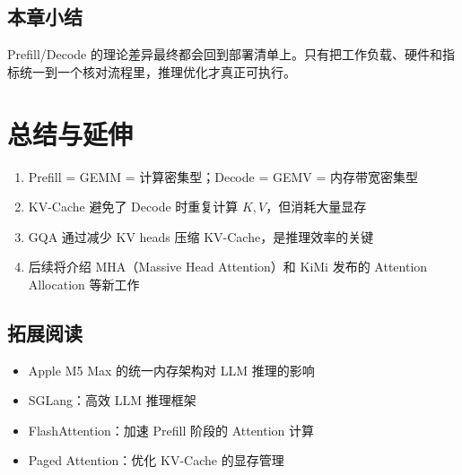 \documentclass[a4paper]{article}
\begin{document}
\subsection{本章小结}
Prefill/Decode 的理论差异最终都会回到部署清单上。只有把工作负载、硬件和指标统一到一个核对流程里，推理优化才真正可执行。

\newpage
\section{总结与延伸}

\begin{enumerate}
  \item Prefill = GEMM = 计算密集型；Decode = GEMV = 内存带宽密集型
  \item KV-Cache 避免了 Decode 时重复计算 $K, V$，但消耗大量显存
  \item GQA 通过减少 KV heads 压缩 KV-Cache，是推理效率的关键
  \item 后续将介绍 MHA（Massive Head Attention）和 KiMi 发布的 Attention Allocation 等新工作
\end{enumerate}

\subsection{拓展阅读}
\begin{itemize}
  \item Apple M5 Max 的统一内存架构对 LLM 推理的影响
  \item SGLang：高效 LLM 推理框架
  \item FlashAttention：加速 Prefill 阶段的 Attention 计算
  \item Paged Attention：优化 KV-Cache 的显存管理
\end{itemize}
\end{document}

